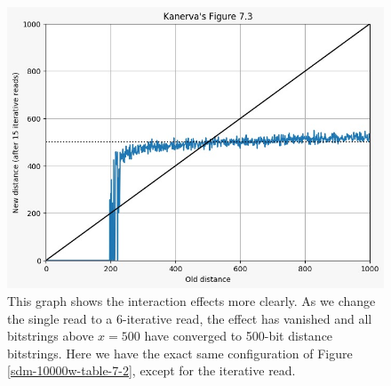 \begin{figure}[h]
\centering\includegraphics[width=\textwidth]{images02/sdm-10000w-table-7-2-15iter.png}
\caption{This graph shows the interaction effects more clearly.  As we change the single read to a 6-iterative read, the effect has vanished and all bitstrings above $x=500$ have converged to 500-bit distance bitstrings. Here we have the exact same configuration of Figure \ref{sdm-10000w-table-7-2}, except for the iterative read.
\label{sdm-10000w-table-7-2-15iter}}
\end{figure}





